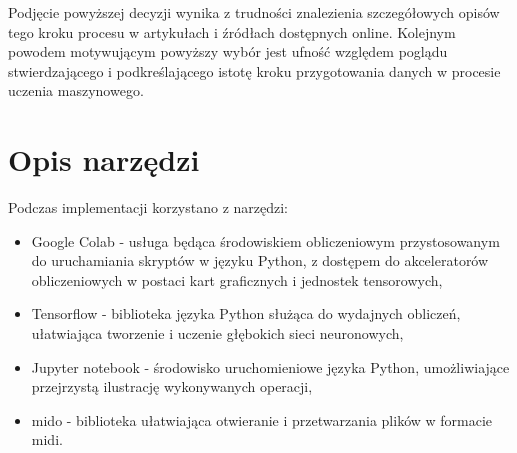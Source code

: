{{    Podjęcie powyższej decyzji wynika z trudności znalezienia szczegółowych opisów tego kroku 
    procesu w artykułach i źródłach dostępnych online. 
    Kolejnym powodem motywującym powyższy wybór jest ufność względem poglądu stwierdzającego i 
    podkreślającego istotę kroku przygotowania danych w procesie uczenia maszynowego.

  }

  \newpage

  \section{Opis narzędzi}
  {
    Podczas implementacji korzystano z narzędzi:
    \begin{itemize}
      \setlength\itemsep{-0.5em}
      \item Google Colab - usługa będąca środowiskiem obliczeniowym przystosowanym 
      do uruchamiania skryptów w języku Python, z dostępem do akceleratorów obliczeniowych
      w postaci kart graficznych i jednostek tensorowych,
      \item Tensorflow - biblioteka języka Python służąca do wydajnych obliczeń, ułatwiająca 
      tworzenie i uczenie głębokich sieci neuronowych,
      \item Jupyter notebook - środowisko uruchomieniowe języka Python, umożliwiające przejrzystą
      ilustrację wykonywanych operacji,
      \item mido - biblioteka ułatwiająca otwieranie i przetwarzania plików w formacie midi.
    \end{itemize}
  }
}